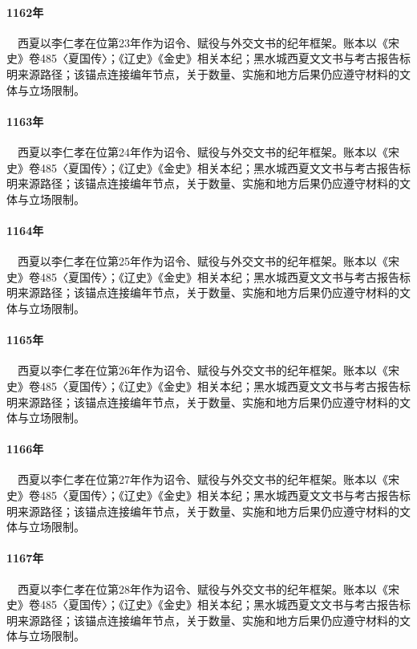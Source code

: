 \paragraph{1162年}　西夏以李仁孝在位第23年作为诏令、赋役与外交文书的纪年框架。账本以《宋史》卷485〈夏国传〉；《辽史》《金史》相关本纪；黑水城西夏文文书与考古报告标明来源路径；该锚点连接编年节点，关于数量、实施和地方后果仍应遵守材料的文体与立场限制。

\paragraph{1163年}　西夏以李仁孝在位第24年作为诏令、赋役与外交文书的纪年框架。账本以《宋史》卷485〈夏国传〉；《辽史》《金史》相关本纪；黑水城西夏文文书与考古报告标明来源路径；该锚点连接编年节点，关于数量、实施和地方后果仍应遵守材料的文体与立场限制。

\paragraph{1164年}　西夏以李仁孝在位第25年作为诏令、赋役与外交文书的纪年框架。账本以《宋史》卷485〈夏国传〉；《辽史》《金史》相关本纪；黑水城西夏文文书与考古报告标明来源路径；该锚点连接编年节点，关于数量、实施和地方后果仍应遵守材料的文体与立场限制。

\paragraph{1165年}　西夏以李仁孝在位第26年作为诏令、赋役与外交文书的纪年框架。账本以《宋史》卷485〈夏国传〉；《辽史》《金史》相关本纪；黑水城西夏文文书与考古报告标明来源路径；该锚点连接编年节点，关于数量、实施和地方后果仍应遵守材料的文体与立场限制。

\paragraph{1166年}　西夏以李仁孝在位第27年作为诏令、赋役与外交文书的纪年框架。账本以《宋史》卷485〈夏国传〉；《辽史》《金史》相关本纪；黑水城西夏文文书与考古报告标明来源路径；该锚点连接编年节点，关于数量、实施和地方后果仍应遵守材料的文体与立场限制。

\paragraph{1167年}　西夏以李仁孝在位第28年作为诏令、赋役与外交文书的纪年框架。账本以《宋史》卷485〈夏国传〉；《辽史》《金史》相关本纪；黑水城西夏文文书与考古报告标明来源路径；该锚点连接编年节点，关于数量、实施和地方后果仍应遵守材料的文体与立场限制。

